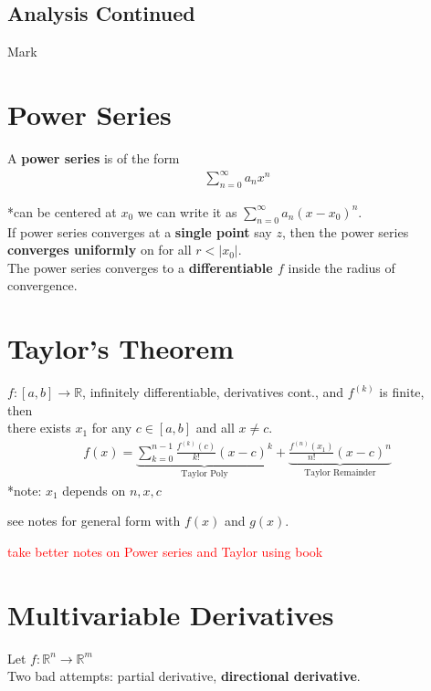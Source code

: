 \documentclass[a4paper, 12pt]{article}
\title{}
\date{}
\def\R{\ensuremath{\mathbb{R}}} %
\newcommand{\bt}[1]{\textbf{#1}} %
\newcommand{\eq}[1]{\begin{align*}#1\end{align*}} %
\newcommand{\gray}[1]{\textcolor[gray]{0.5}{#1}} %
\renewcommand{\eq}[1]{\begin{align*}#1\end{align*}} %
\newcommand{\sn}[1]{\reversemarginpar \marginpar{{\small\gray{#1}}}}
\begin{document}
\begin{center}
\section*{Analysis Continued}
Mark \\
\end{center}


\section*{Power Series}
\sn{def}
A \bt{power series} is of the form 
\eq{
\sum_{n=0}^\infty a_n x^n
}

*can be centered at $x_0$ we can write it as $\sum_{n=0}^\infty a_n(x-x_0)^n$. \\

\sn{uniform convergence}
If power series converges at a \bt{single point} say $z$, then the power series \bt{converges uniformly} on for all $ r < |x_0|$.\\

\sn{converge to diff func}
The power series converges to a \bt{differentiable $f$} inside the radius of convergence.


\section*{Taylor's Theorem}

$f: [a, b] \rightarrow \R$, infinitely differentiable, derivatives cont., and $f^{(k)}$ is finite, \\ then \\
there exists $x_1$ for any $c \in [a, b]$ and all $x \neq c$.
\eq{
f(x) = \underbrace{\sum_{k=0}^{n-1} \frac{f^{(k)}(c)}{k!} (x-c)^k}_{\text{Taylor Poly}} + \underbrace{\frac{f^{(n)}(x_1)}{n!} (x-c)^n}_{\text{Taylor Remainder}}
}
*note: $x_1$ depends on $n, x, c$

see notes for general form with $f(x)$ and $g(x)$.

\textcolor{red}{take better notes on Power series and Taylor using book}

\section*{Multivariable Derivatives}
Let $f: \R^n \rightarrow \R^m$ \\

Two bad attempts: partial derivative, \bt{directional derivative}. \\
\end{document}
